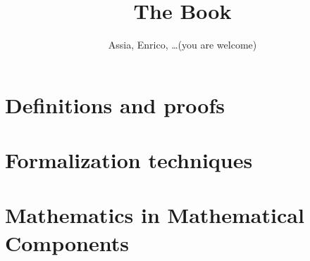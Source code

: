 \documentclass{book}
\title{The Book}
\author{Assia, Enrico, \ldots (you are welcome)}
\begin{document}
\maketitle

% 



\tableofcontents{}

\part{Definitions and proofs}







\part{Formalization techniques}





\part{Mathematics in Mathematical Components}

% 
% 
% 
\end{document}
